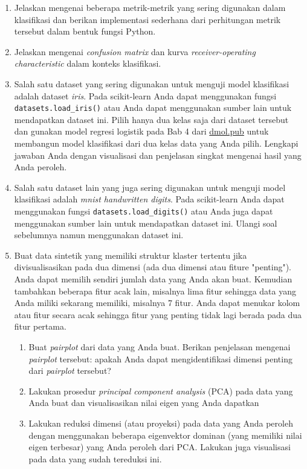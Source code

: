 \documentclass[a4paper,11pt]{article} %
\newcommand{\pyinline}[1]{\texttt{#1}}
\begin{document}
\begin{enumerate}
%
%
\item Jelaskan mengenai beberapa metrik-metrik yang sering digunakan dalam
klasifikasi dan berikan implementasi sederhana dari perhitungan
metrik tersebut dalam bentuk fungsi Python.
%
%
\item Jelaskan mengenai \textit{confusion matrix} dan
kurva \textit{receiver-operating characteristic} dalam konteks klasifikasi.
%
%
\item Salah satu dataset yang sering digunakan untuk menguji model klasifikasi
adalah dataset \textit{iris}.
Pada
scikit-learn Anda dapat menggunakan fungsi \pyinline{datasets.load_iris()}
atau Anda dapat menggunakan sumber lain untuk mendapatkan dataset ini.
Pilih hanya dua
kelas saja dari dataset tersebut dan gunakan model regresi logistik
pada Bab 4 dari \url{dmol.pub} untuk membangun model klasifikasi dari dua kelas data yang
Anda pilih. Lengkapi jawaban Anda dengan visualisasi dan penjelasan singkat mengenai
hasil yang Anda peroleh.
%
%
\item Salah satu dataset lain yang juga sering digunakan untuk menguji
model klasifikasi adalah \textit{mnist handwritten digits}. Pada
scikit-learn Anda dapat menggunakan fungsi \pyinline{datasets.load_digits()} atau
Anda juga dapat menggunakan sumber lain untuk mendapatkan dataset ini.
Ulangi soal sebelumnya
namun menggunakan dataset ini.
%
%
\item Buat data sintetik yang memiliki struktur klaster tertentu
jika divisualisasikan pada dua dimensi (ada dua dimensi atau fiture "penting").
Anda dapat memilih sendiri jumlah data yang Anda akan buat.
Kemudian tambahkan beberapa fitur acak lain, misalnya lima fitur sehingga
data yang Anda miliki sekarang memiliki, misalnya 7 fitur. Anda dapat menukar
kolom atau fitur secara acak sehingga fitur yang penting tidak lagi berada
pada dua fitur pertama.
  \begin{enumerate}
    \item Buat \textit{pairplot} dari data yang Anda buat. Berikan penjelasan
    mengenai \textit{pairplot} tersebut: apakah Anda dapat mengidentifikasi
    dimensi penting dari \textit{pairplot} tersebut?
    \item Lakukan prosedur \textit{principal component analysis} (PCA) pada
    data yang Anda buat dan visualisasikan nilai eigen yang Anda dapatkan
    \item Lakukan reduksi dimensi (atau proyeksi) pada data yang Anda peroleh
    dengan menggunakan beberapa eigenvektor dominan (yang memiliki
    nilai eigen terbesar) yang Anda peroleh dari PCA. Lakukan juga visualisasi
    pada data yang sudah tereduksi ini.
  \end{enumerate}
\end{enumerate}
\end{document}
